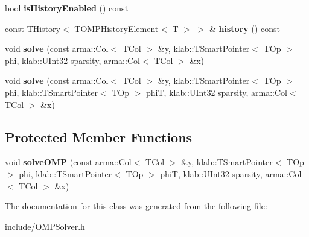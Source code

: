 \begin{DoxyCompactItemize}
\item 
bool {\bfseries is\+History\+Enabled} () const \hypertarget{classkl1p_1_1TOMPSolver_a24fef95ca858f6fe581066e852f98e05}{}\label{classkl1p_1_1TOMPSolver_a24fef95ca858f6fe581066e852f98e05}

\item 
const \hyperlink{classkl1p_1_1THistory}{T\+History}$<$ \hyperlink{classkl1p_1_1TOMPHistoryElement}{T\+O\+M\+P\+History\+Element}$<$ T $>$ $>$ \& {\bfseries history} () const \hypertarget{classkl1p_1_1TOMPSolver_aa70eeeafa769d81ca4c448e63e23995b}{}\label{classkl1p_1_1TOMPSolver_aa70eeeafa769d81ca4c448e63e23995b}

\item 
void {\bfseries solve} (const arma\+::\+Col$<$ T\+Col $>$ \&y, klab\+::\+T\+Smart\+Pointer$<$ T\+Op $>$ phi, klab\+::\+U\+Int32 sparsity, arma\+::\+Col$<$ T\+Col $>$ \&x)\hypertarget{classkl1p_1_1TOMPSolver_ad694c87aa48448ba7b48bc6a7f1e4c22}{}\label{classkl1p_1_1TOMPSolver_ad694c87aa48448ba7b48bc6a7f1e4c22}

\item 
void {\bfseries solve} (const arma\+::\+Col$<$ T\+Col $>$ \&y, klab\+::\+T\+Smart\+Pointer$<$ T\+Op $>$ phi, klab\+::\+T\+Smart\+Pointer$<$ T\+Op $>$ phiT, klab\+::\+U\+Int32 sparsity, arma\+::\+Col$<$ T\+Col $>$ \&x)\hypertarget{classkl1p_1_1TOMPSolver_a1b05436c2ef64fdeb082416fd948ce9c}{}\label{classkl1p_1_1TOMPSolver_a1b05436c2ef64fdeb082416fd948ce9c}

\end{DoxyCompactItemize}
\subsection*{Protected Member Functions}
\begin{DoxyCompactItemize}
\item 
void {\bfseries solve\+O\+MP} (const arma\+::\+Col$<$ T\+Col $>$ \&y, klab\+::\+T\+Smart\+Pointer$<$ T\+Op $>$ phi, klab\+::\+T\+Smart\+Pointer$<$ T\+Op $>$ phiT, klab\+::\+U\+Int32 sparsity, arma\+::\+Col$<$ T\+Col $>$ \&x)\hypertarget{classkl1p_1_1TOMPSolver_a23dea74eb02cf6e82c0635fd87361e1c}{}\label{classkl1p_1_1TOMPSolver_a23dea74eb02cf6e82c0635fd87361e1c}

\end{DoxyCompactItemize}


The documentation for this class was generated from the following file\+:\begin{DoxyCompactItemize}
\item 
include/O\+M\+P\+Solver.\+h\end{DoxyCompactItemize}
